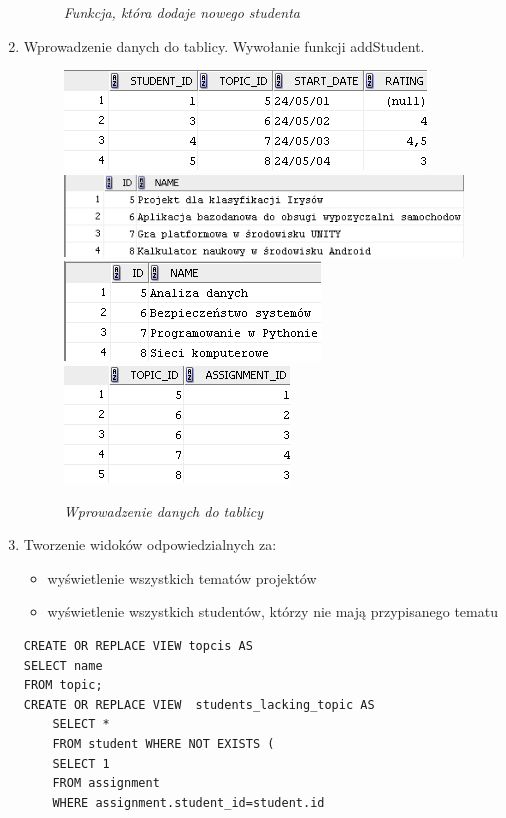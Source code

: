 \documentclass[a4paper, 10pt]{article}
\begin{document}
\begin{enumerate}
\begin{figure}[H]
			\caption{\textit{Funkcja, która dodaje nowego studenta}}
		\end{figure}
	\item Wprowadzenie danych do tablicy. Wywołanie funkcji addStudent.
		\begin{figure}[H]
			\centering
			\includegraphics[scale=0.6]{zadanie6_1.png}
			\includegraphics[scale=0.46]{zadanie6_2.png}\\
			\includegraphics[scale=0.84]{zadanie6_3.png}
			\includegraphics[scale=0.95]{zadanie6_4.png}
			\caption{\textit{Wprowadzenie danych do tablicy}}
		\end{figure}
	\item Tworzenie widoków odpowiedzialnych za:
		\begin{itemize}
			\item wyświetlenie wszystkich tematów projektów 
			\item wyświetlenie wszystkich studentów, którzy nie mają przypisanego tematu
		\end{itemize}
		\begin{lstlisting}[style=SQL, caption=\textit{Tworzenie widoków}]
CREATE OR REPLACE VIEW topcis AS
SELECT name
FROM topic;
CREATE OR REPLACE VIEW  students_lacking_topic AS
	SELECT * 
	FROM student WHERE NOT EXISTS (
	SELECT 1
	FROM assignment
	WHERE assignment.student_id=student.id

\end{lstlisting}
\end{enumerate}
\end{document}
